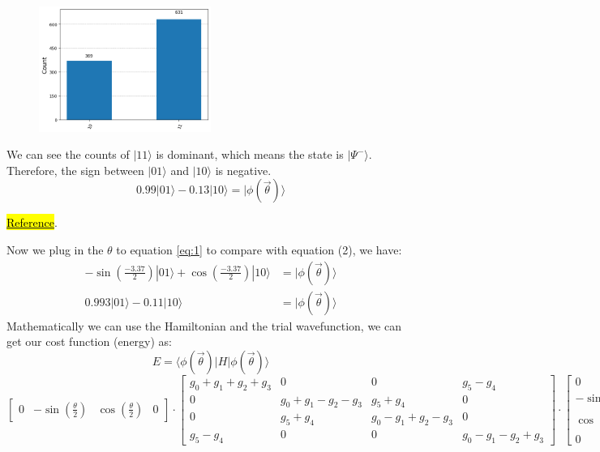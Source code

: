 \documentclass{article}
\begin{document}
\begin{itemize}
\begin{figure}[H]
		      \centering
		      \includegraphics[width=0.5\textwidth, height=0.3\textheight]{BellHis.png}
	      \end{figure}
	      We can see the counts of \(|11\rangle\) is dominant, which means the state is \(|\Psi^-\rangle\). Therefore, the sign between \(|01\rangle\) and \(|10\rangle\) is negative.
	      \begin{equation}
		      0.99 |01\rangle - 0.13 |10\rangle = |\phi(\vec{\theta}) \rangle
	      \end{equation}

	      \href{https://grishmaprs.medium.com/measurement-based-quantum-computation-9de426f40856}{\hl{Reference}}.


	      Now we plug in the \(\theta\) to equation \eqref{eq:1} to compare with equation (2), we have:
	      \begin{align*}
		      -\sin\left(\frac{-3.37}{2}\right) |01 \rangle + \cos\left(\frac{-3.37}{2}\right) |10 \rangle & = |\phi(\vec{\theta}) \rangle \\
		      0.993 |01\rangle  - 0.11 |10\rangle                                                          & = |\phi(\vec{\theta}) \rangle
	      \end{align*}
	      Mathematically we can use the Hamiltonian and the trial wavefunction, we can get our cost function (energy) as:
	      \[E = \langle \phi({\vec{\theta}})| H | \phi(\vec{\theta}) \rangle\]
	      \[
		      \begin{bmatrix}
			      0 & -\sin(\frac{\theta}{2}) & \cos(\frac{\theta}{2}) & 0
		      \end{bmatrix}
		      \cdot
		      \begin{bmatrix}
			      g_0 + g_1 + g_2 + g_3 & 0                     & 0                     & g_5 - g_4              \\
			      0                     & g_0 + g_1 - g_2 - g_3 & g_5 + g_4             & 0                      \\
			      0                     & g_5 + g_4             & g_0 - g_1 + g_2 - g_3 & 0                      \\
			      g_5 - g_4             & 0                     & 0                     & g_0 - g_1 - g_2 +  g_3
		      \end{bmatrix}
		      \cdot
		      \begin{bmatrix}
			      0                        \\
			      - \sin(\frac{\theta}{2}) \\
			      \cos(\frac{\theta}{2})   \\
			      0
		      \end{bmatrix}
	      \]


\end{itemize}
\end{document}
